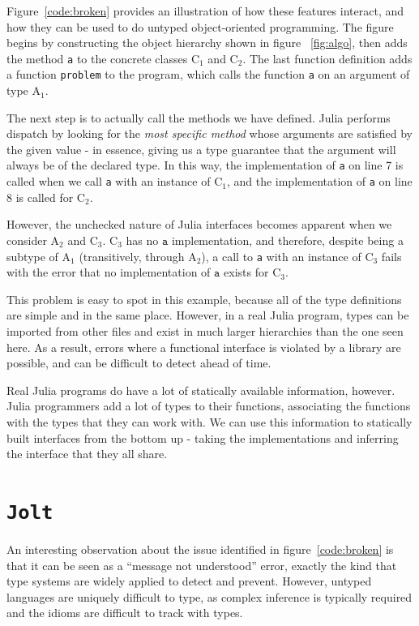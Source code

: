 \documentclass[preprint]{sigplanconf}
\newcommand{\xt}[1]{\texttt{#1}}
\newcommand{\jolt}{\xt{Jolt}}
\newcommand{\cnum}[2]{$\text{#1}_#2$}
\begin{document}
Figure~\ref{code:broken} provides an illustration of how these features 
interact, and how they can be used to do untyped object-oriented programming.
The figure begins by constructing the object hierarchy shown in figure~
\ref{fig:algo}, then adds the method \xt{a} to the concrete classes $\text{C}_1$ and
$\text{C}_2$. The last function definition adds a function \xt{problem} to the
program, which calls the function \xt{a} on an argument of type $\text{A}_1$.

The next step is to actually call the methods we have defined. Julia performs
dispatch by looking for the \emph{most specific method} whose arguments are
satisfied by the given value - in essence, giving us a type guarantee that the
argument will always be of the declared type. In this way, the implementation 
of \xt{a} on line 7 is called when we call \xt{a} with an instance of $\text{C}_1$,
and the implementation of \xt{a} on line 8 is called for $\text{C}_2$.

However, the unchecked nature of Julia interfaces becomes apparent when we consider
$\text{A}_2$ and $\text{C}_3$. \cnum{C}{3} has no $\xt{a}$ implementation, and
therefore, despite being a subtype of \cnum{A}{1} 
(transitively, through \cnum{A}{2}), a call to \xt{a} with an instance of \cnum{C}{3}
fails with the error that no implementation of $\xt{a}$ exists for \cnum{C}{3}.

This problem is easy to spot in this example, because all of the type definitions
are simple and in the same place. However, in a real Julia program, types can be
imported from other files and exist in much larger hierarchies than the one seen
here. As a result, errors where a functional interface is violated by a library
are possible, and can be difficult to detect ahead of time.

Real Julia programs do have a lot of statically available information, however.
Julia programmers add a lot of types to their functions, associating the functions
with the types that they can work with. We can use this information to statically
built interfaces from the bottom up - taking the implementations and inferring the
interface that they all share.

\section{\jolt}
An interesting observation about the issue identified in figure~\ref{code:broken}
is that it can be seen as a ``message not understood'' error, exactly the kind
that type systems are widely applied to detect and prevent. However, untyped 
languages are uniquely difficult to type, as complex inference is typically
required and the idioms are difficult to track with types.
\end{document}
